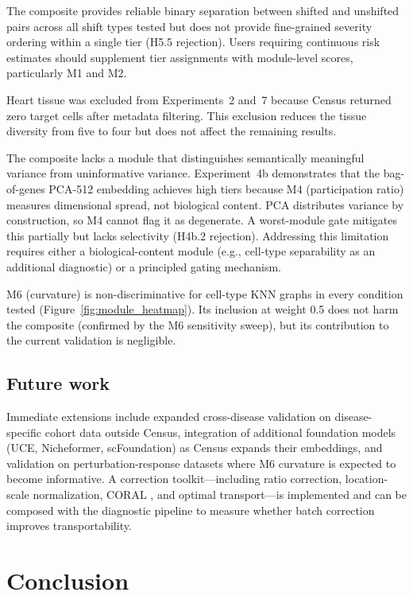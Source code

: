 \documentclass[11pt,letterpaper]{article}
\begin{document}
The composite provides reliable binary separation between shifted and unshifted pairs across all shift types tested but does not provide fine-grained severity ordering within a single tier (H5.5 rejection). Users requiring continuous risk estimates should supplement tier assignments with module-level scores, particularly M1 and M2.

Heart tissue was excluded from Experiments~2 and~7 because Census returned zero target cells after metadata filtering. This exclusion reduces the tissue diversity from five to four but does not affect the remaining results.

The composite lacks a module that distinguishes semantically meaningful variance from uninformative variance. Experiment~4b demonstrates that the bag-of-genes PCA-512 embedding achieves high tiers because M4 (participation ratio) measures dimensional spread, not biological content. PCA distributes variance by construction, so M4 cannot flag it as degenerate. A worst-module gate mitigates this partially but lacks selectivity (H4b.2 rejection). Addressing this limitation requires either a biological-content module (e.g., cell-type separability as an additional diagnostic) or a principled gating mechanism.

M6 (curvature) is non-discriminative for cell-type KNN graphs in every condition tested (Figure~\ref{fig:module_heatmap}). Its inclusion at weight 0.5 does not harm the composite (confirmed by the M6 sensitivity sweep), but its contribution to the current validation is negligible.

\subsection{Future work}

Immediate extensions include expanded cross-disease validation on disease-specific cohort data outside Census, integration of additional foundation models (UCE, Nicheformer, scFoundation) as Census expands their embeddings, and validation on perturbation-response datasets where M6 curvature is expected to become informative. A correction toolkit---including ratio correction, location-scale normalization, CORAL \citep{sun2016coral}, and optimal transport---is implemented and can be composed with the diagnostic pipeline to measure whether batch correction improves transportability.


\section{Conclusion}
\label{sec:conclusion}
\end{document}
